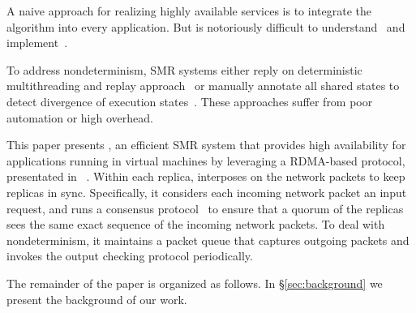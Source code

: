 A naive approach for realizing highly available services is to integrate the \paxos algorithm 
into every application. But \paxos is notoriously difficult to understand~\cite{raft:usenix14} 
and implement~\cite{paxos:practical}.

To address nondeterminism, SMR systems either reply on deterministic multithreading and replay 
approach~\cite{rex:eurosys14} or manually annotate all shared states to detect divergence of execution 
states~\cite{eve:osdi12}. These approaches suffer from poor automation or high overhead.

This paper presents \xxx, an efficient SMR system that provides high availability for applications 
running in virtual machines by leveraging a RDMA-based \paxos protocol, presentated 
in \protocol~\cite{dare:hpdc15}. Within each replica, \xxx interposes on the network packets to keep 
replicas in sync. Specifically, it considers each incoming network packet an input request, and runs 
a \paxos consensus protocol~\cite{paxos:practical} to ensure that a quorum of the replicas sees the 
same exact sequence of the incoming network packets. To deal with nondeterminism, it maintains a packet 
queue that captures outgoing packets and invokes the output checking protocol periodically.

The remainder of the paper is organized as follows. In \S\ref{sec:background} we present the background 
of our work.
